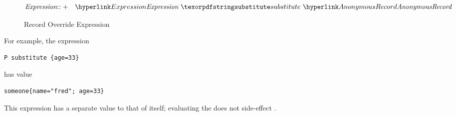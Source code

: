 \begin{figure}[htbp]
\begin{eqnarray*}
\emph{Expression}&\arrowplus&\ntRef{Expression}\ \q{substitute}\ \ntRef{AnonymousRecord}
\end{eqnarray*}
\caption{Record Override Expression}\label{recordOverrideFig}
\end{figure}

For example, the expression
\begin{lstlisting}
P substitute {age=33}
\end{lstlisting}
has value
\begin{lstlisting}
someone{name="fred"; age=33}
\end{lstlisting}
\begin{aside}
This expression has a separate value to that of  itself; evaluating the  does not side-effect .
\end{aside}

